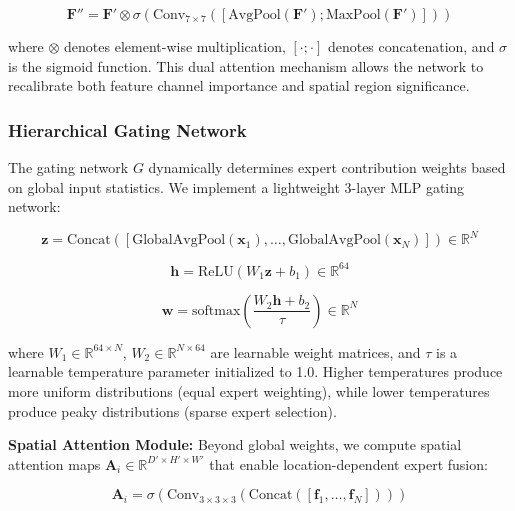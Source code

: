 \documentclass[conference]{IEEEtran}
\begin{document}
\begin{equation}
\mathbf{F}'' = \mathbf{F}' \otimes \sigma(\text{Conv}_{7\times7}([\text{AvgPool}(\mathbf{F}'); \text{MaxPool}(\mathbf{F}')]))
\end{equation}

where $\otimes$ denotes element-wise multiplication, $[\cdot; \cdot]$ denotes concatenation, and $\sigma$ is the sigmoid function. This dual attention mechanism allows the network to recalibrate both feature channel importance and spatial region significance.

\subsubsection{Hierarchical Gating Network}

The gating network $G$ dynamically determines expert contribution weights based on global input statistics. We implement a lightweight 3-layer MLP gating network:

\begin{equation}
\mathbf{z} = \text{Concat}([\text{GlobalAvgPool}(\mathbf{x}_1), \ldots, \text{GlobalAvgPool}(\mathbf{x}_N)]) \in \mathbb{R}^N
\end{equation}

\begin{equation}
\mathbf{h} = \text{ReLU}(W_1 \mathbf{z} + b_1) \in \mathbb{R}^{64}
\end{equation}

\begin{equation}
\mathbf{w} = \text{softmax}\left(\frac{W_2 \mathbf{h} + b_2}{\tau}\right) \in \mathbb{R}^N
\end{equation}

where $W_1 \in \mathbb{R}^{64 \times N}$, $W_2 \in \mathbb{R}^{N \times 64}$ are learnable weight matrices, and $\tau$ is a learnable temperature parameter initialized to 1.0. Higher temperatures produce more uniform distributions (equal expert weighting), while lower temperatures produce peaky distributions (sparse expert selection).

\textbf{Spatial Attention Module:} Beyond global weights, we compute spatial attention maps $\mathbf{A}_i \in \mathbb{R}^{D' \times H' \times W'}$ that enable location-dependent expert fusion:

\begin{equation}
\mathbf{A}_i = \sigma(\text{Conv}_{3\times3\times3}(\text{Concat}([\mathbf{f}_1, \ldots, \mathbf{f}_N])))
\end{equation}
\end{document}
